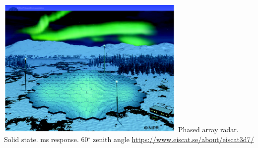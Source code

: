 \begin{frame}[fragile,t]
\frametitle{\hfill}
\vspace{0.1in}
\begin{center}
\includegraphics[height=2.7in]{eiscat_3d_array.png}
\vfill
    {\colblack Phased array radar. Solid state. ms response. 60$^\circ$ zenith angle}
    {\small \url{https://www.eiscat.se/about/eiscat3d7/}}
\end{center}
\end{frame}


